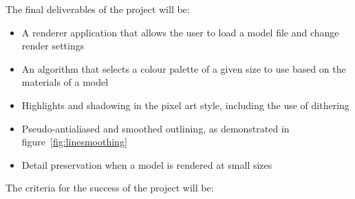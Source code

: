 \documentclass[12pt]{article}
\begin{document}
The final deliverables of the project will be:

\begin{itemize}

\item A renderer application that allows the user to load a model file and change render settings

\item An algorithm that selects a colour palette of a given size to use based on the materials of a model

\item Highlights and shadowing in the pixel art style, including the use of dithering

\item Pseudo-antialiased and smoothed outlining, as demonstrated in figure~\ref{fig:linesmoothing}

\item Detail preservation when a model is rendered at small sizes

\end{itemize}

The criteria for the success of the project will be:
\end{document}
